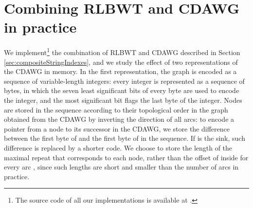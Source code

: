 \documentclass[a4paper,UKenglish]{lipics-v2016}
\begin{document}
 























































\section{Combining RLBWT and CDAWG in practice}

We implement\footnote{The source code of all our implementations is available at \cite{githubMathieu}.} the combination of RLBWT and CDAWG described in Section \ref{sec:compositeStringIndexes}, and we study the effect of two representations of the CDAWG in memory. In the first representation, the graph is encoded as a sequence of variable-length integers: every integer is represented as a sequence of bytes, in which the seven least significant bits of every byte are used to encode the integer, and the most significant bit flags the last byte of the integer. Nodes are stored in the sequence according to their topological order in the graph obtained from the CDAWG by inverting the direction of all arcs: to encode a pointer from a node  to its successor  in the CDAWG, we store the difference between the first byte of  and the first byte of  in the sequence. If  is the sink, such difference is replaced by a shorter code. We choose to store the length of the maximal repeat that corresponds to each node, rather than the offset of  inside  for every arc , since such lengths are short and smaller than the number of arcs in practice.
\end{document}
